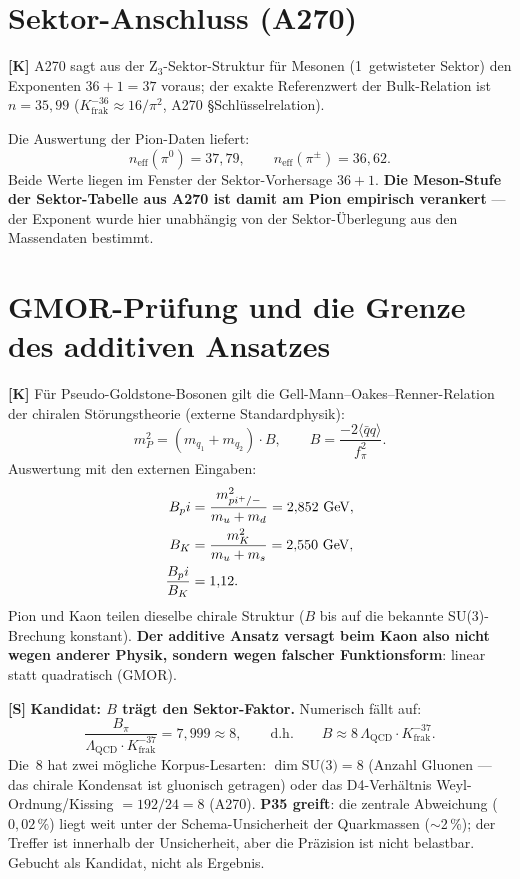 \section{Sektor-Anschluss (A270)}

\textbf{[K]} A270 sagt aus der Z$_3$-Sektor-Struktur für Mesonen
(1~getwisteter Sektor) den Exponenten $36+1 = 37$ voraus; der exakte
Referenzwert der Bulk-Relation ist $n = 35{,}99$
($K_\text{frak}^{-36} \approx 16/\pi^2$, A270 \S{}Schlüsselrelation).

Die Auswertung der Pion-Daten liefert:
\[
  n_\text{eff}(\pi^0) = 37{,}79, \qquad n_\text{eff}(\pi^\pm) = 36{,}62.
\]
Beide Werte liegen im Fenster der Sektor-Vorhersage $36+1$.
\textbf{Die Meson-Stufe der Sektor-Tabelle aus A270 ist damit am Pion
empirisch verankert} --- der Exponent wurde hier unabhängig von der
Sektor-Überlegung aus den Massendaten bestimmt.

\section{GMOR-Prüfung und die Grenze des additiven Ansatzes}

\textbf{[K]} Für Pseudo-Goldstone-Bosonen gilt die
Gell-Mann--Oakes--Renner-Relation der chiralen Störungstheorie
(externe Standardphysik):
\[
  m_P^2 = (m_{q_1} + m_{q_2})\cdot B,
  \qquad B = \frac{-2\langle\bar qq\rangle}{f_\pi^2}.
\]
Auswertung mit den externen Eingaben:
\begin{align}
  B_\pi &= \frac{m_{\pi^\pm}^2}{m_u+m_d} = 2{,}852\ \text{GeV}, \notag\\
  B_K   &= \frac{m_K^2}{m_u+m_s}         = 2{,}550\ \text{GeV}, \notag\\
  \frac{B_\pi}{B_K} &= 1{,}12. \notag
\end{align}
Pion und Kaon teilen dieselbe chirale Struktur ($B$ bis auf die bekannte
SU(3)-Brechung konstant). \textbf{Der additive Ansatz versagt beim Kaon
also nicht wegen anderer Physik, sondern wegen falscher Funktionsform}:
linear statt quadratisch (GMOR).

\medskip
\textbf{[S]} \textbf{Kandidat: $B$ trägt den Sektor-Faktor.}
Numerisch fällt auf:
\[
  \frac{B_\pi}{\Lambda_\text{QCD}\cdot K_\text{frak}^{-37}}
  = 7{,}999 \approx 8,
  \qquad\text{d.h.}\qquad
  B \approx 8\,\Lambda_\text{QCD}\cdot K_\text{frak}^{-37}.
\]
Die~8 hat zwei mögliche Korpus-Lesarten: $\dim\text{SU(3)} = 8$
(Anzahl Gluonen --- das chirale Kondensat ist gluonisch getragen) oder
das D4-Verhältnis Weyl-Ordnung/Kissing $= 192/24 = 8$ (A270).
\textbf{P35 greift}: die zentrale Abweichung ($0{,}02\,\%$) liegt weit
unter der Schema-Unsicherheit der Quarkmassen ($\sim$2\,\%); der
Treffer ist innerhalb der Unsicherheit, aber die Präzision ist nicht
belastbar. Gebucht als Kandidat, nicht als Ergebnis.


